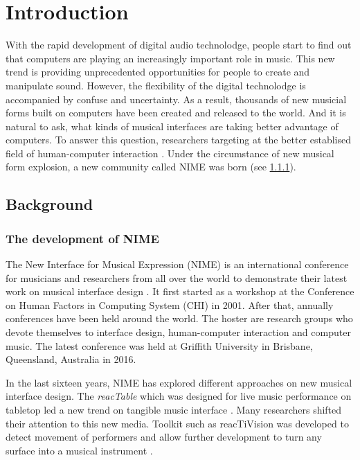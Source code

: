 \chapter{Introduction}

With the rapid development of digital audio technolodge, people start to find out that computers are playing an increasingly important role in music. This new trend is providing unprecedented opportunities for people to create and manipulate sound. However, the flexibility of the digital technolodge is accompanied by confuse and uncertainty. As a result, thousands of new musicial forms built on computers have been created and released to the world. And it is natural to ask, what kinds of musical interfaces are taking better advantage of computers. To answer this question, researchers targeting at the better establised field of human-computer interaction \citep{Reference16}. Under the circumstance of new musical form explosion, a new community called NIME was born (see \ref{subsec: nime}).

\section{Background}
\label{sec: backgound}

\subsection{The development of NIME}
\label{subsec: nime}
The New Interface for Musical Expression (NIME) is an international conference for musicians and researchers from all over the world to demonstrate their latest work on musical interface design \citep{Reference15}. It first started as a workshop at the Conference on Human Factors in Computing System (CHI) in 2001. After that, annually conferences have been held around the world. The hoster are research groups who devote themselves to interface design, human-computer interaction and computer music. The latest conference was held at Griffith University in Brisbane, Queensland, Australia in 2016.

In the last sixteen years, NIME has explored different approaches on new musical interface design. The \textit{reacTable} which was designed for live music performance on tabletop led a new trend on tangible music interface \citep{Reference17}. Many researchers shifted their attention to this new media. Toolkit such as reacTiVision was developed to detect movement of performers and allow further development to turn any surface into a musical instrument \citep{Reference18}.


